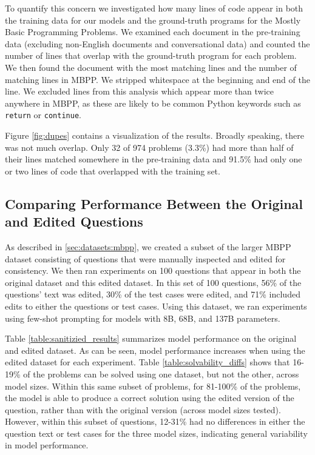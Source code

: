 To quantify this concern we investigated how many lines of code appear in both the training data for our models and the ground-truth programs for the Mostly Basic Programming Problems. We examined each document in the pre-training data (excluding non-English documents and conversational data) and counted the number of lines that overlap with the ground-truth program for each problem. We then found the document with the most matching lines and the number of matching lines in MBPP. We stripped whitespace at the beginning and end of the line. We excluded lines from this analysis which appear more than twice anywhere in MBPP, as these are likely to be common Python keywords such as \texttt{return} or \texttt{continue}.

Figure \ref{fig:dupes} contains a visualization of the results. Broadly speaking, there was not much overlap. Only 32 of 974 problems (3.3\%) had more than half of their lines matched somewhere in the pre-training data and 91.5\% had only one or two lines of code that overlapped with the training set.

\subsection{Comparing Performance Between the Original and Edited Questions}
\label{sec:comparing_edited}
As described in \autoref{sec:datasets:mbpp}, we created a subset of the larger MBPP dataset consisting of questions that were manually inspected and edited for consistency. We then ran experiments on 100 questions that appear in both the original dataset and this edited dataset. In this set of 100 questions, 56\% of the questions' text was edited, 30\% of the test cases were edited, and 71\% included edits to either the questions or test cases. Using this dataset, we ran experiments using few-shot prompting for models with 8B, 68B, and 137B parameters.

Table \ref{table:sanitizied_results} summarizes model performance on the original and edited dataset. As can be seen, model performance increases when using the edited dataset for each experiment. Table \ref{table:solvability_diffs} shows that 16-19\% of the problems can be solved using one dataset, but not the other, across model sizes. Within this same subset of problems, for 81-100\% of the problems, the model is able to produce a correct solution using the edited version of the question, rather than with the original version (across model sizes tested). However, within this subset of questions, 12-31\% had no differences in either the question text or test cases for the three model sizes, indicating general variability in model performance.

